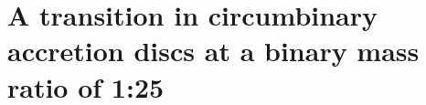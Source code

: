 \chapter[A transition in circumbinary discs]{A transition in circumbinary accretion discs at a binary mass ratio of 1:25}
\label{ch:CBDTrans}




        









